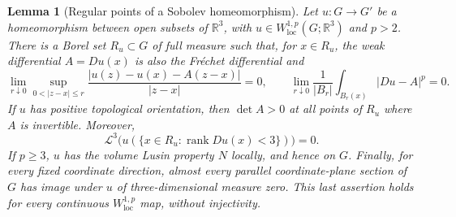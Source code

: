 \documentclass[11pt]{article}
\numberwithin{equation}{section}
\newtheorem{lemma}[theorem]{Lemma}
\theoremstyle{definition}
\theoremstyle{remark}
\newcommand{\R}{\mathbb R}
\newcommand{\cL}{\mathcal L}
\DeclareMathOperator{\rank}{rank}
\begin{document}
\begin{lemma}[Regular points of a Sobolev homeomorphism]\label{hp:regularity}
Let $u:G\to G'$ be a homeomorphism between open subsets of $\R^3$,
with $u\in W^{1,p}_{\mathrm{loc}}(G;\R^3)$ and $p>2$.
There is a Borel set $R_u\subset G$ of full measure such that, for
$x\in R_u$, the weak differential $A=Du(x)$ is also the Fr\'echet
differential and
\begin{equation}\label{hp:regular-point-tests}
 \lim_{r\downarrow0}\sup_{0<|z-x|\le r}
 \frac{|u(z)-u(x)-A(z-x)|}{|z-x|}=0,
 \qquad
 \lim_{r\downarrow0}\frac{1}{|B_r|}
 \int_{B_r(x)}|Du-A|^p=0.
\end{equation}
If $u$ has positive topological orientation, then $\det A>0$ at
all points of $R_u$ where $A$ is invertible.  Moreover,
\begin{equation}\label{hp:deficient-image-null}
 \cL^3\bigl(u(\{x\in R_u:\rank Du(x)<3\})\bigr)=0.
\end{equation}
If $p\ge3$, $u$ has the volume Lusin property $N$ locally, and hence
on $G$.  Finally, for every fixed coordinate direction, almost every
parallel coordinate-plane section of $G$ has image under $u$ of
three-dimensional measure zero.  This last assertion holds for every
continuous $W^{1,p}_{\mathrm{loc}}$ map, without injectivity.
\end{lemma}
\end{document}

